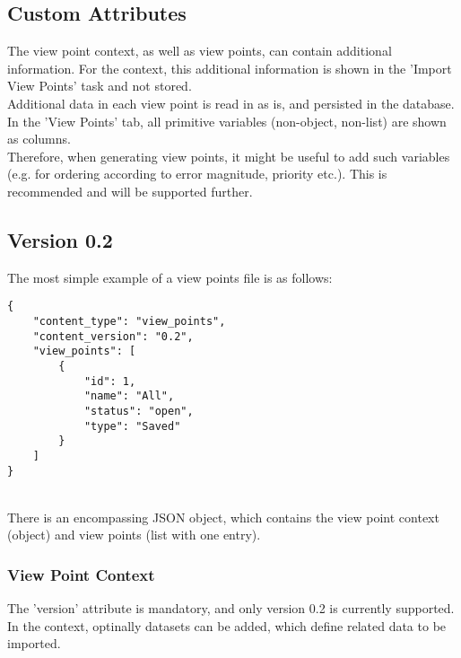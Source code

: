\subsection{Custom Attributes}
\label{sec:view_points_custom_attributes} 

The view point context, as well as view points, can contain additional information. For the context, this additional information is shown in the 'Import View Points' task and not stored. \\

Additional data in each view point is read in as is, and persisted in the database. In the 'View Points' tab, all primitive variables (non-object, non-list) are shown as columns. \\

Therefore, when generating view points, it might be useful to add such variables (e.g. for ordering according to error magnitude, priority etc.). This is recommended and will be supported further.
 
\subsection{Version 0.2}

The most simple example of a view points file is as follows:

\begin{lstlisting}[basicstyle=\small\ttfamily]
{
    "content_type": "view_points",
    "content_version": "0.2",
    "view_points": [
        {
            "id": 1,
            "name": "All",
            "status": "open",
            "type": "Saved"
        }
    ]
}

\end{lstlisting}
\ \\

There is an encompassing JSON object, which contains the view point context (object) and view points (list with one entry). \\

\subsubsection{View Point Context}

The 'version' attribute is mandatory, and only version 0.2 is currently supported. \\

In the context, optinally datasets can be added, which define related data to be imported.

